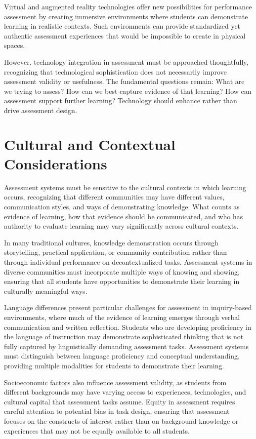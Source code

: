 \documentclass[
  Letterpaper,
]{scrbook}
\begin{document}
Virtual and augmented reality technologies offer new possibilities for
performance assessment by creating immersive environments where students
can demonstrate learning in realistic contexts. Such environments can
provide standardized yet authentic assessment experiences that would be
impossible to create in physical spaces.

However, technology integration in assessment must be approached
thoughtfully, recognizing that technological sophistication does not
necessarily improve assessment validity or usefulness. The fundamental
questions remain: What are we trying to assess? How can we best capture
evidence of that learning? How can assessment support further learning?
Technology should enhance rather than drive assessment design.

\section{Cultural and Contextual
Considerations}\label{cultural-and-contextual-considerations}

Assessment systems must be sensitive to the cultural contexts in which
learning occurs, recognizing that different communities may have
different values, communication styles, and ways of demonstrating
knowledge. What counts as evidence of learning, how that evidence should
be communicated, and who has authority to evaluate learning may vary
significantly across cultural contexts.

In many traditional cultures, knowledge demonstration occurs through
storytelling, practical application, or community contribution rather
than through individual performance on decontextualized tasks.
Assessment systems in diverse communities must incorporate multiple ways
of knowing and showing, ensuring that all students have opportunities to
demonstrate their learning in culturally meaningful ways.

Language differences present particular challenges for assessment in
inquiry-based environments, where much of the evidence of learning
emerges through verbal communication and written reflection. Students
who are developing proficiency in the language of instruction may
demonstrate sophisticated thinking that is not fully captured by
linguistically demanding assessment tasks. Assessment systems must
distinguish between language proficiency and conceptual understanding,
providing multiple modalities for students to demonstrate their
learning.

Socioeconomic factors also influence assessment validity, as students
from different backgrounds may have varying access to experiences,
technologies, and cultural capital that assessment tasks assume. Equity
in assessment requires careful attention to potential bias in task
design, ensuring that assessment focuses on the constructs of interest
rather than on background knowledge or experiences that may not be
equally available to all students.
\end{document}
